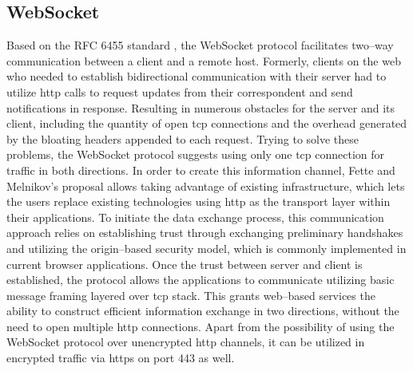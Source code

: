 \subsection{WebSocket}
\label{ch:Fundamentals:sec:Data Exchange:ssec:WebSocket}

Based on the RFC 6455 standard \cite{melnikov_websocket_2011}, the WebSocket protocol facilitates two--way communication between a client and a remote host. Formerly, clients on the web who needed to establish bidirectional communication with their server had to utilize \acrshort{http} calls to request updates from their correspondent and send notifications in response.
Resulting in numerous obstacles for the server and its client, including the quantity of open \acrfull{tcp} connections and the overhead generated by the bloating headers appended to each request.
Trying to solve these problems, the WebSocket protocol suggests using only one \acrshort{tcp} connection for traffic in both directions.
In order to create this information channel, Fette and Melnikov's proposal allows taking advantage of existing infrastructure, which lets the users replace existing technologies using \acrshort{http} as the transport layer within their applications.
To initiate the data exchange process, this communication approach relies on establishing trust through exchanging preliminary handshakes and utilizing the origin--based security model, which is commonly implemented in current browser applications.
Once the trust between server and client is established, the protocol allows the applications to communicate utilizing basic message framing layered over \acrshort{tcp} stack. This grants web--based services the ability to construct efficient information exchange in two directions, without the need to open multiple \acrshort{http} connections.
Apart from the possibility of using the WebSocket protocol over unencrypted \acrshort{http} channels, it can be utilized in encrypted traffic via \acrfull{https} on port 443 as well.
